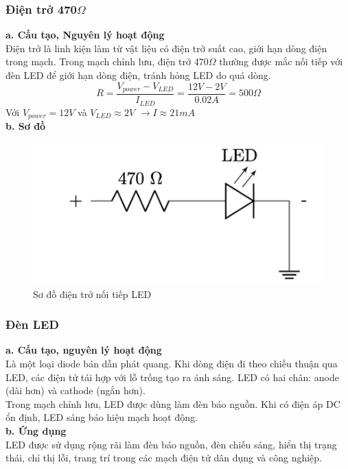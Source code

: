 \documentclass[a4paper,15pt]{article}
\begin{document}
\subsubsection{Điện trở 470$\Omega$ }
\textbf{a. Cấu tạo, Nguyên lý hoạt động} \\
Điện trở là linh kiện làm từ vật liệu có điện trở suất cao, giới hạn dòng điện trong 
mạch. Trong mạch chỉnh lưu, điện trở 470$\Omega$ thường được mắc nối tiếp với đèn LED 
để giới hạn dòng điện, tránh hỏng LED do quá dòng. \\
\[
R = \frac{V_{power}- V_{LED}}{I_{LED}} = \frac{12V - 2V}{0.02A} = 500 \Omega
\] 
Với $V_{power} = 12V $ và $V_{LED} \approx 2V$ $\rightarrow I \approx 21mA$ \\
\textbf{b. Sơ đồ} \\
\begin{figure}[H]
    \centering
    \includegraphics[scale=0.6]{img/Dientro.PNG}
    \caption{Sơ đồ điện trở nối tiếp LED}
    \label{fig:enter-label}
\end{figure}
\subsubsection{Đèn LED}
\textbf{a. Cấu tạo, nguyên lý hoạt động} \\
Là một loại diode bán dẫn phát quang. Khi dòng điện đi theo chiều thuận qua LED, các điện 
tử tái hợp với lỗ trống tạo ra ánh sáng. LED có hai chân: anode (dài hơn) và cathode (ngắn 
hơn).  \\
Trong mạch chỉnh lưu, LED được dùng làm đèn báo nguồn. Khi có điện áp DC ổn định, LED 
sáng báo hiệu mạch hoạt động.\\
\textbf{b. Ứng dụng} \\
LED được sử dụng rộng rãi làm đèn báo nguồn, đèn chiếu sáng, hiển thị trạng thái, chỉ thị 
lỗi, trang trí trong các mạch điện tử dân dụng và công nghiệp.\\
\end{document}
